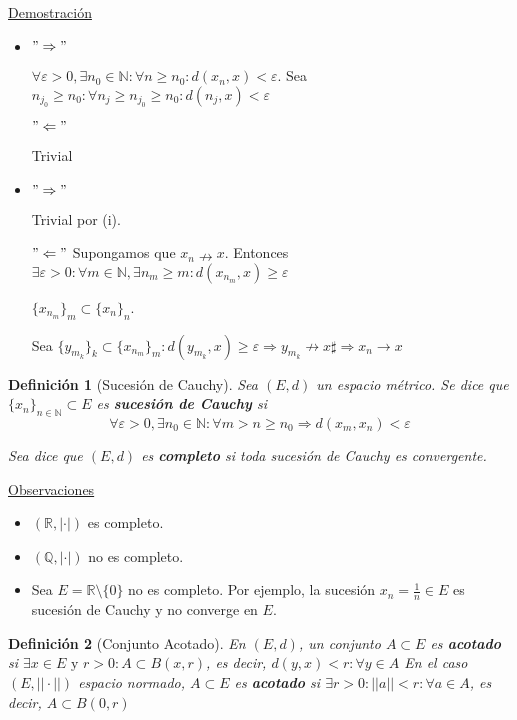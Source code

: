 \documentclass[10pt,a4paper,openright]{book}
\theoremstyle{break}
\newtheorem*{defi}{Definición}
\begin{document}
\underline{Demostración}
\begin{itemize}
\item $"\Rightarrow"$ 

$\forall \varepsilon > 0, \exists n_0 \in \mathbb{N} : \forall n \geq n_0 : d(x_n,x) < \varepsilon$. Sea $n_{j_0} \geq n_0 : \forall n_j \geq n_{j_0} \geq n_0 : d(n_{j}, x) < \varepsilon$

$"\Leftarrow"$

Trivial

\item  $"\Rightarrow"$

Trivial por (i).

$"\Leftarrow"$ Supongamos que $x_n  \nrightarrow x$. Entonces $\exists \varepsilon > 0 : \forall m \in \mathbb{N}, \exists n_m \geq m : d(x_{n_m}, x) \geq \varepsilon$

$\{x_{n_m}\}_m \subset \{x_n\}_n$.

Sea $\{y_{m_k}\}_k \subset \{x_{n_m}\}_m : d(y_{m_k}, x) \geq \varepsilon\Rightarrow y_{m_k} \nrightarrow x \sharp \Rightarrow x_n \to x$ 
 

\end{itemize}

\begin{defi}[Sucesión de Cauchy]
Sea $(E,d)$ un espacio métrico. Se dice que $\{x_n\}_{n\in \mathbb{N}} \subset E$ es \textbf{sucesión de Cauchy} si $$\forall \varepsilon > 0, \exists n_0 \in \mathbb{N} : \forall m > n \geq n_0 \Rightarrow d(x_m, x_n) < \varepsilon$$

Sea dice que $(E,d)$ es \textbf{completo} si toda sucesión de Cauchy es convergente.
\end{defi}

\underline{Observaciones}

\begin{itemize}
\item $(\mathbb{R}, |\cdot|)$ es completo.

\item $(\mathbb{Q}, |\cdot|)$ no es completo.

\item Sea $E = \mathbb{R} \setminus \{0\}$ no es completo. Por ejemplo, la sucesión $x_n = \frac{1}{n} \in E$ es sucesión de Cauchy y no converge en $E$.
\end{itemize}

\begin{defi}[Conjunto Acotado]
En $(E,d)$, un conjunto $A \subset E$ es \textbf{acotado} si $\exists x \in E \mbox{ y } r > 0 : A \subset B(x,r)$, es decir, $d(y,x) < r : \forall y \in A$
En el caso $(E, ||\cdot||)$ espacio normado, $A \subset E$ es \textbf{acotado} si $\exists r > 0 : ||a|| < r : \forall a \in A$, es decir, $A \subset B(0,r)$
\end{defi}
\end{document}
